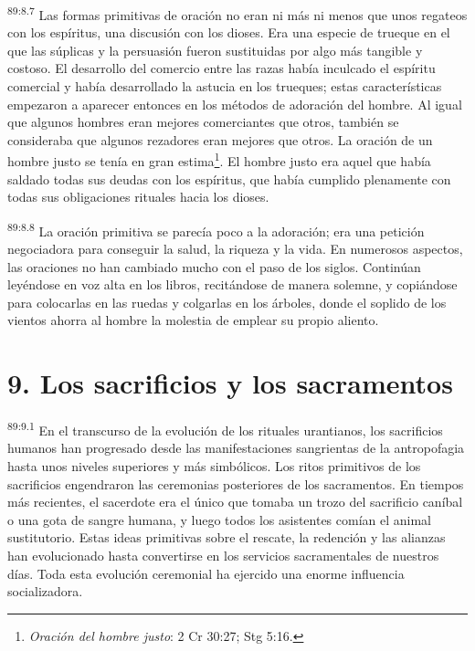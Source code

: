 \par
\textsuperscript{89:8.7} Las formas primitivas de oración no eran ni más ni menos que unos regateos con los espíritus, una discusión con los dioses. Era una especie de trueque en el que las súplicas y la persuasión fueron sustituidas por algo más tangible y costoso. El desarrollo del comercio entre las razas había inculcado el espíritu comercial y había desarrollado la astucia en los trueques; estas características empezaron a aparecer entonces en los métodos de adoración del hombre. Al igual que algunos hombres eran mejores comerciantes que otros, también se consideraba que algunos rezadores eran mejores que otros. La oración de un hombre justo se tenía en gran estima\footnote{\textit{Oración del hombre justo}: 2 Cr 30:27; Stg 5:16.}. El hombre justo era aquel que había saldado todas sus deudas con los espíritus, que había cumplido plenamente con todas sus obligaciones rituales hacia los dioses.

\par
\textsuperscript{89:8.8} La oración primitiva se parecía poco a la adoración; era una petición negociadora para conseguir la salud, la riqueza y la vida. En numerosos aspectos, las oraciones no han cambiado mucho con el paso de los siglos. Continúan leyéndose en voz alta en los libros, recitándose de manera solemne, y copiándose para colocarlas en las ruedas y colgarlas en los árboles, donde el soplido de los vientos ahorra al hombre la molestia de emplear su propio aliento.

\section*{9. Los sacrificios y los sacramentos}
\par
\textsuperscript{89:9.1} En el transcurso de la evolución de los rituales urantianos, los sacrificios humanos han progresado desde las manifestaciones sangrientas de la antropofagia hasta unos niveles superiores y más simbólicos. Los ritos primitivos de los sacrificios engendraron las ceremonias posteriores de los sacramentos. En tiempos más recientes, el sacerdote era el único que tomaba un trozo del sacrificio caníbal o una gota de sangre humana, y luego todos los asistentes comían el animal sustitutorio. Estas ideas primitivas sobre el rescate, la redención y las alianzas han evolucionado hasta convertirse en los servicios sacramentales de nuestros días. Toda esta evolución ceremonial ha ejercido una enorme influencia socializadora.

